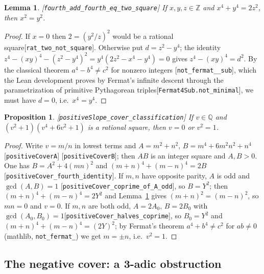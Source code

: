 \documentclass[10pt]{article}
\newtheorem{proposition}[theorem]{Proposition}
\newtheorem{lemma}[theorem]{Lemma}
\theoremstyle{definition}
\theoremstyle{remark}
\newcommand{\Q}{\mathbb{Q}}
\newcommand{\Z}{\mathbb{Z}}
\newcommand{\leanref}[1]{{\scriptsize\textup{[\texttt{#1}]}}\allowbreak}
\begin{document}
\begin{lemma}\label{lem:fermat-two}
\leanref{fourth\_\allowbreak add\_\allowbreak fourth\_\allowbreak eq\_\allowbreak two\_\allowbreak square}
If $x,y,z\in\Z$ and $x^4+y^4=2z^2$, then $x^2=y^2$.
\end{lemma}

\begin{proof}
If $x=0$ then $2=(y^2/z)^2$ would be a rational square\leanref{rat\_\allowbreak two\_\allowbreak not\_\allowbreak square}.
Otherwise put $d=z^2-y^4$; the identity
$z^4-(xy)^4-(z^2-y^4)^2=y^4(2z^2-x^4-y^4)=0$ gives $z^4-(xy)^4=d^2$.
By the classical theorem $a^4-b^4\ne c^2$ for nonzero integers
\leanref{not\_\allowbreak fermat\_\_\allowbreak sub}, which the Lean development proves by
Fermat's infinite descent through the parametrization of primitive
Pythagorean triples\leanref{Fermat4\allowbreak Sub.not\_\allowbreak minimal}, we must have $d=0$, i.e.\
$x^4=y^4$.
\end{proof}

\begin{proposition}\label{prop:Dplus}
\leanref{positive\allowbreak Slope\_\allowbreak cover\_\allowbreak classification}
If $v\in\Q$ and $(v^2+1)(v^4+6v^2+1)$ is a rational square, then $v=0$ or $v^2=1$.
\end{proposition}

\begin{proof}
Write $v=m/n$ in lowest terms and $A=m^2+n^2$, $B=m^4+6m^2n^2+n^4$
\leanref{positive\allowbreak Cover\allowbreak A} \leanref{positive\allowbreak Cover\allowbreak B}; then $AB$ is an integer
square and $A,B>0$.  One has $B=A^2+4(mn)^2$ and
$(m+n)^4+(m-n)^4=2B$\leanref{positive\allowbreak Cover\_\allowbreak fourth\_\allowbreak identity}.
If $m,n$ have opposite parity, $A$ is odd and $\gcd(A,B)=1$
\leanref{positive\allowbreak Cover\_\allowbreak coprime\_\allowbreak of\_\allowbreak A\_\allowbreak odd}, so $B=Y^2$; then
$(m+n)^4+(m-n)^4=2Y^2$ and Lemma~\ref{lem:fermat-two} gives $(m+n)^2=(m-n)^2$,
so $mn=0$ and $v=0$.  If $m,n$ are both odd, $A=2A_0$, $B=2B_0$ with
$\gcd(A_0,B_0)=1$\leanref{positive\allowbreak Cover\_\allowbreak halves\_\allowbreak coprime}, so $B_0=Y^2$ and
$(m+n)^4+(m-n)^4=(2Y)^2$; by Fermat's theorem $a^4+b^4\ne c^2$ for
$ab\ne0$ (mathlib, \texttt{not\_\allowbreak fermat\_\allowbreak 42}) we get $m=\pm n$, i.e.\ $v^2=1$.
\end{proof}

\subsection{The negative cover: a 3-adic obstruction}
\end{document}
